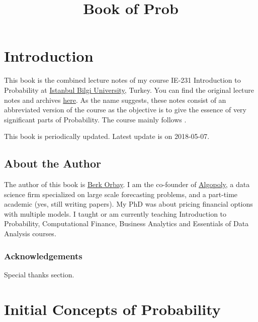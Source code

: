 \documentclass[]{book}
\title{Book of Prob}
\author{}
\date{}
\theoremstyle{definition}
\theoremstyle{definition}
\theoremstyle{definition}
\theoremstyle{remark}
\begin{document}
\maketitle

{
\setcounter{tocdepth}{1}
\tableofcontents
}
\hypertarget{introduction}{%
\chapter*{Introduction}\label{introduction}}

This book is the combined lecture notes of my course IE-231 Introduction
to Probability at \href{https://www.bilgi.edu.tr}{Istanbul Bilgi
University}, Turkey. You can find the original lecture notes and
archives \href{https://berkorbay.github.io/bilgi-ie231/}{here}. As the
name suggests, these notes consist of an abbreviated version of the
course as the objective is to give the essence of very significant parts
of Probability. The course mainly follows \citep{myers2012}.

This book is periodically updated. Latest update is on 2018-05-07.

\hypertarget{about-the-author}{%
\section*{About the Author}\label{about-the-author}}

The author of this book is \href{http://berkorbay.me}{Berk Orbay}. I am
the co-founder of \href{http://algopoly.com}{Algopoly}, a data science
firm specialized on large scale forecasting problems, and a part-time
academic (yes, still writing papers). My PhD was about pricing financial
options with multiple models. I taught or am currently teaching
Introduction to Probability, Computational Finance, Business Analytics
and Essentials of Data Analysis courses.

\hypertarget{acknowledgements}{%
\subsection*{Acknowledgements}\label{acknowledgements}}

Special thanks section.

\hypertarget{intro}{%
\chapter{Initial Concepts of Probability}\label{intro}}
\end{document}
